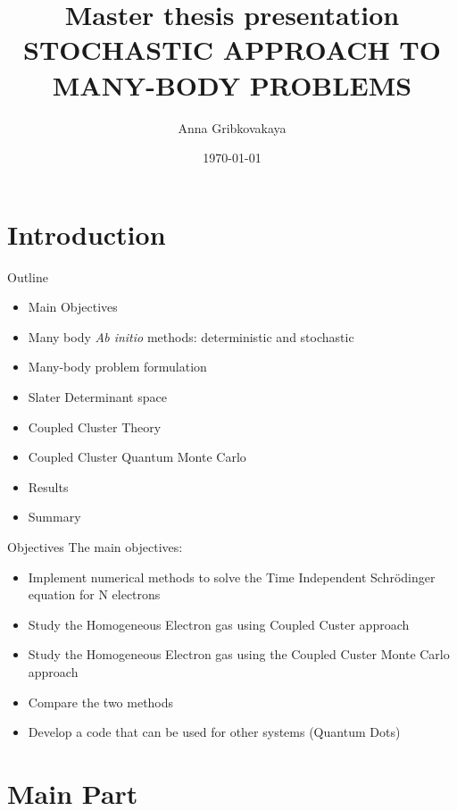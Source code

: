 \documentclass{beamer}
\title{Master thesis presentation\\
STOCHASTIC APPROACH TO MANY-BODY PROBLEMS}
\date{\today}
\author{Anna Gribkovakaya}
\institute{University of Oslo}
\begin{document}
  \maketitle
  \section{Introduction}
   \begin{frame}{Outline}
   \begin{itemize}
   	\item Main Objectives
   	\item Many body \textit{Ab initio} methods: deterministic and stochastic
   	\item Many-body problem formulation
   	\item Slater Determinant space
   	\item Coupled Cluster Theory
   	\item Coupled Cluster Quantum Monte Carlo
   	\item Results
   	\item Summary
   \end{itemize}
 \end{frame}
   \begin{frame}{Objectives}
	The main objectives:
	\begin{itemize}
 	\item Implement numerical methods to solve the Time Independent Schr\"{o}dinger equation for N electrons
 	\item Study the Homogeneous Electron gas using Coupled Custer approach
 	\item Study the Homogeneous Electron gas using the Coupled Custer Monte Carlo approach
 	\item Compare the two methods
 	\item Develop a code that can be used for other systems (Quantum Dots)
	\end{itemize}
	\end{frame}


  \section{Main Part}
  
\end{document}
